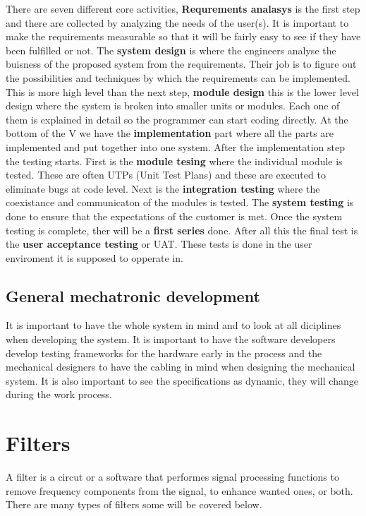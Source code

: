 \documentclass[12pt,a4paper]{article}
\begin{document}
There are seven different core activities, \textbf{Requrements analasys} 
is the first step and there are collected by analyzing the needs of the 
user(s). It is important to make the requirements measurable so that it
will be fairly easy to see if they have been fulfilled or not. The 
\textbf{system design} is where the engineers analyse the 
buisness of the proposed system from the requirements. 
Their job is to figure out the possibilities and techniques by which the requirements can be
implemented. This is more high level than the next step, \textbf{module
design} this is the lower level design where the system is broken into
smaller units or modules. Each one of them is explained in detail so the
programmer can start coding directly. At the bottom of the V we have the
\textbf{implementation} part where all the parts are implemented and put together
into one system. After the implementation step the testing starts. First
is the \textbf{module tesing} where the individual module is tested.
These are often UTPs (Unit Test Plans) and these are executed to
eliminate bugs at code level. Next is the \textbf{integration testing}
where the coexistance and communicaton of the modules is tested. The
\textbf{system testing} is done to ensure that the expectations of the
customer is met. Once the system testing is complete, ther will be a
\textbf{first series} done. After all this the final test is the
\textbf{user acceptance testing} or UAT. These tests is done in the user
enviroment it is supposed to opperate in.

\subsection{General mechatronic development}

It is important to have the whole system in mind and to look at all
diciplines when developing the system. It is important to have the
software developers develop testing frameworks for the hardware early in
the process and the mechanical designers to have the cabling in mind
when designing the mechanical system. It is also important to see the
specifications as dynamic, they will change during the work process. 

\section{Filters}
  A filter is a circut or a software that performes signal processing
  functions to remove frequency components from the signal, to enhance
  wanted ones, or both. There are many types of filters some will be
  covered below.
\end{document}

